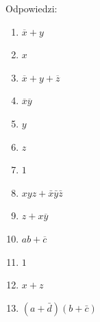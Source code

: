 Odpowiedzi:
\begin{enumerate}
    \item $\overline{x} + y$
    \item $x$
    \item $\overline{x} + y + \overline{z}$
    \item $\overline{x}\overline{y}$
    \item $y$
    \item $z$
    \item $1$
    \item $xyz + \bar{x}\bar{y}\bar{z}$
    \item $z + x\overline{y}$
    \item $ab + \overline{c}$
    \item $1$
    \item $x + z$
    \item $(a + \bar{d})(b + \bar{c})$
\end{enumerate}